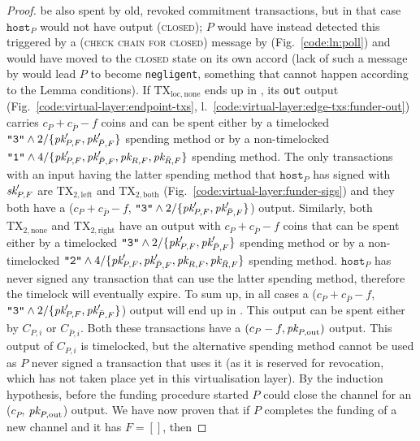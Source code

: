 \begin{proof}
  be also spent by old, revoked commitment transactions, but in that case
  $\texttt{host}_P$ would not have output (\textsc{closed}); $P$ would have
  instead detected this triggered by a (\textsc{check chain for closed}) message
  by \environment (Fig.~\ref{code:ln:poll}) and would have moved to the
  \textsc{closed} state on its own accord (lack of such a message by
  \environment would lead $P$ to become \texttt{negligent}, something that
  cannot happen according to the Lemma conditions). If
  $\mathrm{TX}_{\mathrm{loc}, \mathrm{none}}$ ends up in \ledger, its
  \texttt{out} output (Fig.~\ref{code:virtual-layer:endpoint-txs},
  l.~\ref{code:virtual-layer:edge-txs:funder-out}) carries $c_P + c_{\bar{P}} -
  f$ coins and can be spent either by a timelocked $\texttt{"3"} \wedge
  2/\{\textit{pk}_{P, F}', \textit{pk}_{\bar{P}, F}'\}$ spending method or by a non-timelocked
  $\texttt{"1"} \wedge 4/\{\textit{pk}_{P, F}', \textit{pk}_{\bar{P}, F}', \textit{pk}_{R, F}, \textit{pk}_{\bar{R},
  F}\}$ spending method. The only transactions with an input having the latter
  spending method that $\texttt{host}_P$ has signed with $\textit{sk}_{P, F}'$ are
  $\mathrm{TX}_{2, \mathrm{left}}$ and $\mathrm{TX}_{2, \mathrm{both}}$
  (Fig.~\ref{code:virtual-layer:funder-sigs}) and they both have a ($c_P +
  c_{\bar{P}} - f$, $\texttt{"3"} \wedge 2/\{\textit{pk}_{P,F}', \textit{pk}_{\bar{P},F}'\}$)
  output. Similarly, both $\mathrm{TX}_{2, \mathrm{none}}$ and $\mathrm{TX}_{2,
  \mathrm{right}}$ have an output with $c_P + c_{\bar{P}} - f$ coins that can be
  spent either by a timelocked $\texttt{"3"} \wedge 2/\{\textit{pk}_{P,F}',
  \textit{pk}_{\bar{P},F}'\}$ spending method or by a non-timelocked $\texttt{"2"} \wedge
  4/\{\textit{pk}_{P, F}', \textit{pk}_{\bar{P}, F}', \textit{pk}_{R, F}, \textit{pk}_{\bar{R}, F}\}$ spending
  method.  $\texttt{host}_P$ has never signed any transaction that can use the
  latter spending method, therefore the timelock will eventually expire. To sum
  up, in all cases a ($c_P + c_{\bar{P}} - f$, $\texttt{"3"} \wedge
  2/\{\textit{pk}_{P,F}', \textit{pk}_{\bar{P},F}'\}$) output will end up in \ledger. This output
  can be spent either by $C_{P, i}$ or $C_{\bar{P}, i}$.  Both these
  transactions have a $(c_P - f, \textit{pk}_{P, \mathrm{out}})$ output. This output of
  $C_{P, i}$ is timelocked, but the alternative spending method cannot be used
  as $P$ never signed a transaction that uses it (as it is reserved for
  revocation, which has not taken place yet in this virtualisation layer).  By
  the induction hypothesis, before the funding procedure started $P$ could close
  the channel for an ($c_P$, $\textit{pk}_{P, \mathrm{out}}$) output. We have now proven
  that if $P$ completes the funding of a new channel and it has $F = []$, then

\end{proof}
